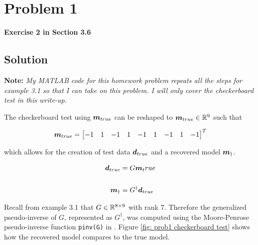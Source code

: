 
\begingroup
\allowdisplaybreaks

\newpage
\section{Problem 1}

\textbf{Exercise 2 in Section 3.6}

\subsection{Solution}
	
\textbf{Note: } \textit{My MATLAB code for this homework problem repeats all the steps for example 3.1 so that I can take on this problem. I will only cover the checkerboard test in this write-up.}
\newline

The checkerboard test using $\boldsymbol{m}_{true}$ can be reshaped to $\boldsymbol{m}_{true} \in \mathbb{R}^9$ such that

\begin{align*}
	\boldsymbol{m}_{true} = \begin{bmatrix}
		-1 & 1 & -1 & 1 & -1 & 1 & -1 & 1 & -1
	\end{bmatrix}^T
\end{align*}

which allows for the creation of test data $\boldsymbol{d}_{true}$ and a recovered model $\boldsymbol{m}_{\dagger}$.

\begin{align*}
	\boldsymbol{d}_{true} &= G \boldsymbol{m}_true \\
	\\
	\boldsymbol{m}_{\dagger} &= G^{\dagger} \boldsymbol{d}_{true}
\end{align*}

Recall from example 3.1 that $G \in \mathbb{R}^{8 \times 9}$ with rank $7$. Therefore the generalized pseudo-inverse of $G$, represented as $G^{\dagger}$, was computed using the Moore-Penrose pseudo-inverse function \verb*|pinv(G)| in \MATLAB. Figure \ref{fig: prob1 checkerboard test} shows how the recovered model compares to the true model. 


